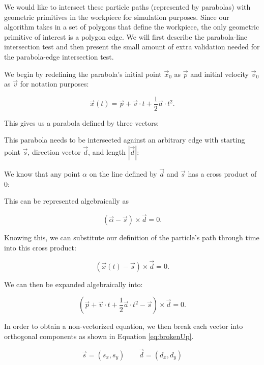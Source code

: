 We would like to intersect these particle paths (represented by parabolas) with geometric primitives in the workpiece for simulation purposes. Since our algorithm takes in a set of polygons that define the workpiece, the only geometric primitive of interest is a polygon edge. We will first describe the parabola-line intersection test and then present the small amount of extra validation needed for the parabola-edge intersection test.

We begin by redefining the parabola's initial point $\vec{x}_0$ as $\vec{p}$ and initial velocity $\vec{v}_0$ as $\vec{v}$ for notation purposes:

$$
\vec{x}(t) = \vec{p} + \vec{v} \cdot t + \frac{1}{2} \vec{a} \cdot t^2.
$$

This gives us a parabola defined by three vectors:


This parabola needs to be intersected against an arbitrary edge with starting point $\vec{s}$, direction vector $\vec{d}$, and length $|\vec{d}|$:


We know that any point $\alpha$ on the line defined by $\vec{d}$ and $\vec{s}$ has a cross product of 0:


This can be represented algebraically as

$$
(\vec{\alpha} - \vec{s}) \times \vec{d} = 0.
$$

Knowing this, we can substitute our definition of the particle's path through time into this cross product:

$$
(\vec{x}(t) - \vec{s}) \times \vec{d} = 0.
$$

We can then be expanded algebraically into:

$$
(\vec{p} + \vec{v} \cdot t + \frac{1}{2} \vec{a} \cdot t^2 - \vec{s}) \times \vec{d} = 0.
$$

In order to obtain a non-vectorized equation, we then break each vector into orthogonal components as shown in Equation \eqref{eq:brokenUp}.

$$
\vec{s} = (s_x, s_y) \qquad \vec{d} = (d_x, d_y)
$$


